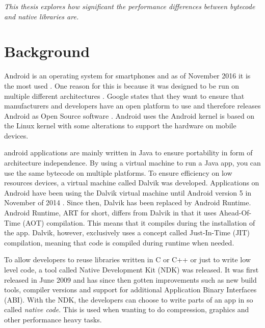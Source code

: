 
\textit{This thesis explores how significant the performance differences between bytecode and native libraries are.}


\section{Background}
Android is an operating system for smartphones and as of November 2016 it is the most used \cite{android:os:popularity}. One reason for this is because it was designed to be run on multiple different architectures \cite{android:os:devices}. Google states that they want to ensure that manufacturers and developers have an open platform to use and therefore releases Android as Open Source software \cite{android:os:opensource}. Android uses the Android kernel is based on the Linux kernel with some alterations to support the hardware on mobile devices.


\gls{android} applications are mainly written in Java to ensure portability in form of architecture independence. By using a virtual machine to run a Java app, you can use the same bytecode on multiple platforms. To ensure efficiency on low resources devices, a virtual machine called Dalvik was developed. Applications on Android have been using the Dalvik virtual machine until Android version 5 \cite{android:dalvik} in November of 2014 \cite{android:dalvik:release}. Since then, Dalvik has been replaced by Android Runtime. Android Runtime, ART for short, differs from Dalvik in that it uses Ahead-Of-Time (AOT) compilation. This means that it compiles during the installation of the app. Dalvik, however, exclusively uses a concept called Just-In-Time (JIT) compilation, meaning that code is compiled during runtime when needed.


To allow developers to reuse libraries written in C or C++ or just to write low level code, a tool called Native Development Kit (NDK) was released. It was first released in June 2009 \cite{Lin2011} and has since then gotten improvements such as new build tools, compiler versions and support for additional Application Binary Interfaces (ABI). With the NDK, the developers can choose to write parts of an app in so called \emph{native code}. This is used when wanting to do compression, graphics and other performance heavy tasks.

